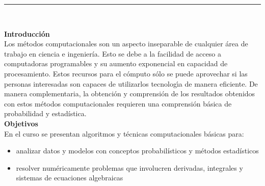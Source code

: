 \documentclass[letterpaper,10pt,onecolumn]{article}
\begin{document}





\noindent\rule{\textwidth}{1pt}\\[-0.1cm]

\addtocounter{mysection}{1}

\noindent\textbf{\large {} \quad Introducci\'on}\\[-0.2cm]


\noindent\normalsize Los m\'etodos computacionales son un aspecto
inseparable de cualquier \'area de trabajo en ciencia e ingenier\'ia.
Esto se debe a la facilidad de acceso a 
computadoras programables  y su aumento exponencial en capacidad de
procesamiento.
Estos recursos para el c\'omputo s\'olo se puede aprovechar si las
personas interesadas son capaces de utilizarlos tecnolog\'{\i}a
de manera eficiente.
De manera complementaria, la obtenci\'on y comprensi\'on de los resultados obtenidos
con estos m\'etodos computacionales requieren una comprensi\'on
b\'asica de probabilidad y estad\'istica. \\[0.1cm] 

\noindent\textbf{\large {} \quad Objetivos}\\[-0.2cm]

\noindent\normalsize En el curso se presentan
algoritmos y t\'ecnicas computacionales b\'asicas para:

\begin{itemize}
\item analizar datos y modelos con conceptos probabil\'isticos y
  m\'etodos estad\'isticos \\[-0.6cm] 
\item resolver num\'ericamente problemas que involucren derivadas,
  integrales y sistemas de ecuaciones algebraicas \\[-0.6cm]
\end{itemize} 
\vspace*{0.5cm} 
\end{document}
